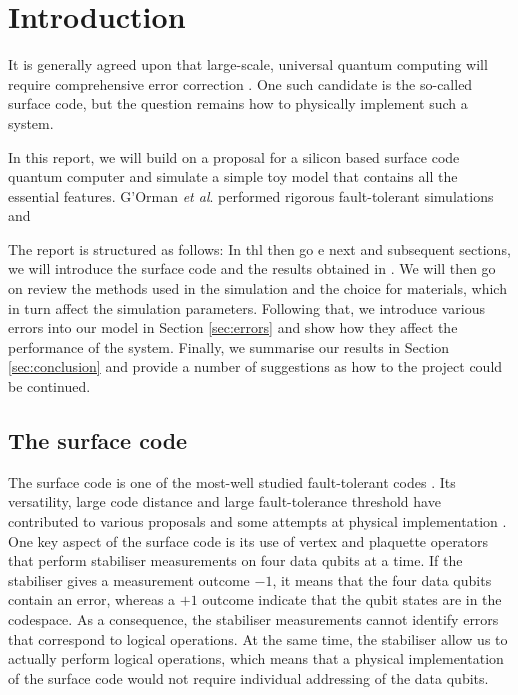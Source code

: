 
\section{Introduction} \label{sec:Introduction}

It is generally agreed upon that large-scale, universal quantum computing will require comprehensive error correction \cite{Wang2011,Fowler2012}. One such candidate is the so-called surface code, but the question remains how to physically implement such a system. 

In this report, we will build on a proposal for a silicon based surface code quantum computer \cite{the paper} and simulate a simple toy model that contains all the essential features. G'Orman \textit{et al}. performed rigorous fault-tolerant simulations and 




The report is structured as follows: In thl then go e next and subsequent sections, we will introduce the surface code and the results obtained in \cite{the paper}. We will then go on review the methods used in the simulation and the choice for materials, which in turn affect the simulation parameters. Following that, we introduce various errors into our model in Section \ref{sec:errors} and show how they affect the performance of the system. Finally, we summarise our results in Section \ref{sec:conclusion} and provide a number of suggestions as how to the project could be continued.  

\subsection{The surface code}
The surface code is one of the most-well studied fault-tolerant codes \cite{something}. Its versatility, large code distance and large fault-tolerance threshold have contributed to various proposals \cite{some review} and some attempts at physical implementation \cite{Martinis?}. One key aspect of the surface code is its use of vertex and plaquette operators that perform stabiliser measurements on four data qubits at a time. If the stabiliser gives a measurement outcome $-1$, it means that the four data qubits contain an error, whereas a $+1$ outcome indicate that the qubit states are in the codespace. As a consequence, the stabiliser measurements cannot identify errors that correspond to logical operations. At the same time, the stabiliser allow us to actually perform logical operations, which means that a physical implementation of the surface code would not require individual addressing of the data qubits. 

